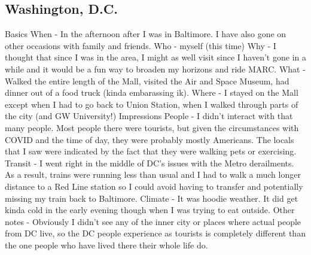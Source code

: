 \documentclass{article}
\begin{document}
    \subsection{Washington, D.C.}
    \begin{outline}
    \1 Basics
        \2 When - In the afternoon after I was in Baltimore. I have also gone on other occasions with family and friends. 
        \2 Who - myself (this time)
        \2 Why - I thought that since I was in the area, I might as well visit since I haven't gone in a while and it would be a fun way to broaden my horizons and ride MARC. 
        \2 What - Walked the entire length of the Mall, visited the Air and Space Museum, had dinner out of a food truck (kinda embarassing ik). 
        \2 Where - I stayed on the Mall except when I had to go back to Union Station, when I walked through parts of the city (and GW University!)
    \1 Impressions
        \2 People - I didn't interact with that many people. Most people there were tourists, but given the circumstances with COVID and the time of day, they were probably mostly Americans. The locals that I saw were indicated by the fact that they were walking pets or exercising. 
        \2 Transit - I went right in the middle of DC's issues with the Metro derailments. As a result, trains were running less than usual and I had to walk a much longer distance to a Red Line station so I could avoid having to transfer and potentially missing my train back to Baltimore. 
        \2 Climate - It was hoodie weather. It did get kinda cold in the early evening though when I was trying to eat outside. 
        \2 Other notes - Obviously I didn't see any of the inner city or places where actual people from DC live, so the DC people experience as tourists is completely different than the one people who have lived there their whole life do. 
    \end{outline}
\end{document}
